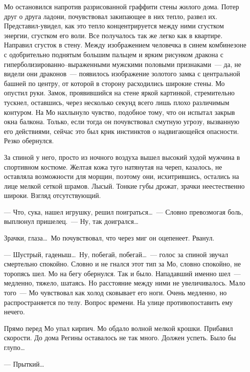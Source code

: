 Мо остановился напротив разрисованной граффити стены жилого дома. Потер друг о 
друга ладони, почувствовал закипающее в них тепло, развел их. 
Представил-увидел, 
как это тепло концентрируется между ними сгустком энергии, сгустком его воли. 
Все получалось так же легко как в квартире. Направил сгусток в стену. Между 
изображением человечка в синем комбинезоне с одобрительно поднятым большим 
пальцем и ярким рисунком дракона с гиперболизированно--выраженными мужскими 
половыми признаками~--- да, не видели они драконов~--- появилось изображение 
золотого замка с центральной башней по центру, от которой в сторону расходились 
широкие стены. Мо опустил руки. Замок, проявившийся на стене яркой картинкой, 
стремительно тускнел, оставшись, через несколько секунд всего лишь плохо 
различимым контуром. На Мо нахлынуло чувство, подобное тому, что он испытал 
закрыв окна балкона. Только, если тогда он почувствовал смутную угрозу, 
вызванную его действиями, сейчас это был крик инстинктов о надвигающейся 
опасности. Резко обернулся.



За спиной у него, просто из ночного воздуха вышел высокий худой мужчина в 
спортивном костюме. Желтая кожа туго натянутая на череп, казалось, не оставляла 
возможности для морщин, поэтому они, исхитрившись, остались на лице мелкой 
сеткой шрамов. Лысый. Тонкие губы дрожат, зрачки неестественно широки. Взгляд 
отсутствующий.


\noindent --- Что, сука, нашел игрушку, решил поиграться\ldots~--- Словно превозмогая 
боль, 
выплюнул пришелец.~--- Ну, так доигрался\ldots



Зрачки, глаза\ldots\ Мо почувствовал, что через миг он оцепенеет. Рванул.


\noindent --- Шустрый, гаденыш\ldots\ Ну, побегай, побегай\ldots~--- голос за спиной 
звучал 
смертельно спокойно. Словно и не гнался этот тип за Мо, словно спокойно, не 
торопясь шел. Мо на бегу обернулся. Так и было. Нападавший именно шел~--- 
медленно, тяжело, шатаясь. Но расстояние между ними не увеличивалось. Мало того~--- Мо чувствовал как холод сковывает его ноги. Очень медленно, но 
распространяется по телу. Вопрос времени. На улице противопоставить ему нечего.


Прямо перед Мо упал кирпич. Мо обдало волной мелкой крошки. Прибавил скорости. 
До дома Регины оставалось не так много. Должен успеть. Было бы глупо\ldots


\noindent --- Прыткий\ldots


